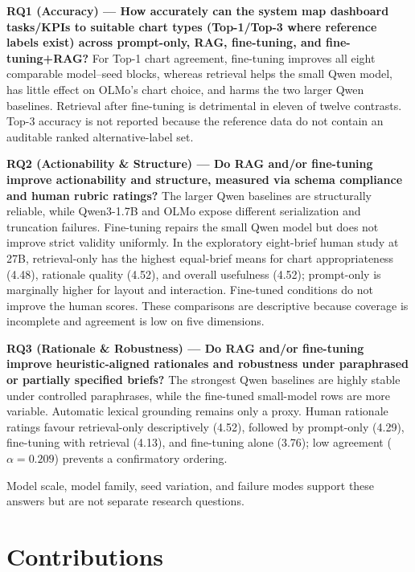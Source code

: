 \textbf{RQ1 (Accuracy) --- How accurately can the system map dashboard tasks/KPIs to suitable chart types (Top-1/Top-3 where reference labels exist) across prompt-only, RAG, fine-tuning, and fine-tuning+RAG?} For Top-1 chart agreement, fine-tuning improves all eight comparable model--seed blocks, whereas retrieval helps the small Qwen model, has little effect on OLMo's chart choice, and harms the two larger Qwen baselines. Retrieval after fine-tuning is detrimental in eleven of twelve contrasts. Top-3 accuracy is not reported because the reference data do not contain an auditable ranked alternative-label set.

\textbf{RQ2 (Actionability \& Structure) --- Do RAG and/or fine-tuning improve actionability and structure, measured via schema compliance and human rubric ratings?} The larger Qwen baselines are structurally reliable, while Qwen3-1.7B and OLMo expose different serialization and truncation failures. Fine-tuning repairs the small Qwen model but does not improve strict validity uniformly. In the exploratory eight-brief human study at 27B, retrieval-only has the highest equal-brief means for chart appropriateness (4.48), rationale quality (4.52), and overall usefulness (4.52); prompt-only is marginally higher for layout and interaction. Fine-tuned conditions do not improve the human scores. These comparisons are descriptive because coverage is incomplete and agreement is low on five dimensions.

\textbf{RQ3 (Rationale \& Robustness) --- Do RAG and/or fine-tuning improve heuristic-aligned rationales and robustness under paraphrased or partially specified briefs?} The strongest Qwen baselines are highly stable under controlled paraphrases, while the fine-tuned small-model rows are more variable. Automatic lexical grounding remains only a proxy. Human rationale ratings favour retrieval-only descriptively (4.52), followed by prompt-only (4.29), fine-tuning with retrieval (4.13), and fine-tuning alone (3.76); low agreement ($\alpha=0.209$) prevents a confirmatory ordering.

Model scale, model family, seed variation, and failure modes support these answers but are not separate research questions.

\section{Contributions}

